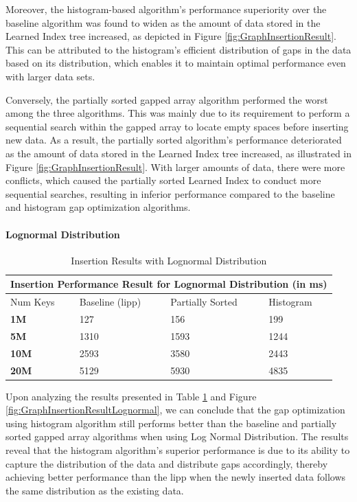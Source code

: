 \documentclass[11pt,a4paper]{article}
\newcommand{\learnindex}{\textsf{Learned Index}\xspace}
\begin{document}
Moreover, the histogram-based algorithm's performance superiority over the baseline algorithm was found to widen as the amount of data stored in the \learnindex tree increased, as depicted in Figure \ref{fig:GraphInsertionResult}. This can be attributed to the histogram's efficient distribution of gaps in the data based on its distribution, which enables it to maintain optimal performance even with larger data sets.

Conversely, the partially sorted gapped array algorithm performed the worst among the three algorithms. This was mainly due to its requirement to perform a sequential search within the gapped array to locate empty spaces before inserting new data. As a result, the partially sorted algorithm's performance deteriorated as the amount of data stored in the \learnindex tree increased, as illustrated in Figure \ref{fig:GraphInsertionResult}. With larger amounts of data, there were more conflicts, which caused the partially sorted \learnindex to conduct more sequential searches, resulting in inferior performance compared to the baseline and histogram gap optimization algorithms.


\paragraph{Lognormal Distribution}
\begin{table}
    \centering
    \begin{tabular}{ |p{2cm}|p{2cm}|p{2cm}|p{2cm}| } 
        
     \hline
     \multicolumn{4}{|c|}{Insertion Performance Result for Lognormal Distribution (in ms)} \\
     \hline
      Num Keys & Baseline (\acrshort{lipp})  & Partially Sorted & Histogram \\
     \hline
     \textbf{1M} & 127 & 156 & 199 \\
     \textbf{5M} & 1310 & 1593 & 1244 \\
     \textbf{10M} & 2593 & 3580 & 2443 \\
     \textbf{20M} & 5129 & 5930 & 4835 \\
     \hline
    
    \end{tabular}
     \caption{Insertion Results with Lognormal Distribution}
    \label{tab:InsertionResultLognormal}
\end{table}

Upon analyzing the results presented in Table \ref{tab:InsertionResultLognormal} and Figure \ref{fig:GraphInsertionResultLognormal}, we can conclude that the gap optimization using histogram algorithm still performs better than the baseline and partially sorted gapped array algorithms when using Log Normal Distribution. The results reveal that the histogram algorithm's superior performance is due to its ability to capture the distribution of the data and distribute gaps accordingly, thereby achieving better performance than the \acrshort{lipp} when the newly inserted data follows the same distribution as the existing data.
\end{document}
